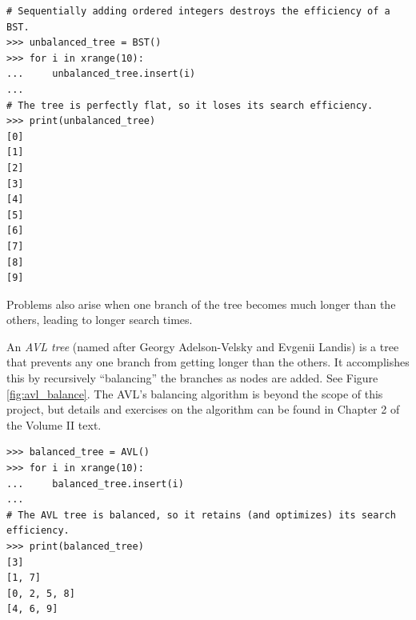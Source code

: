 \begin{lstlisting}
# Sequentially adding ordered integers destroys the efficiency of a BST.
>>> unbalanced_tree = BST()
>>> for i in xrange(10):
...     unbalanced_tree.insert(i)
... 
# The tree is perfectly flat, so it loses its search efficiency.
>>> print(unbalanced_tree)
[0]
[1]
[2]
[3]
[4]
[5]
[6]
[7]
[8]
[9]
\end{lstlisting}

Problems also arise when one branch of the tree becomes much longer than the others, leading to longer search times.

An \emph{AVL tree} (named after Georgy Adelson-Velsky and Evgenii Landis) is a tree that prevents any one branch from getting longer than the others.
It accomplishes this by recursively ``balancing'' the branches as nodes are added.
See Figure \ref{fig:avl_balance}.
The AVL's balancing algorithm is beyond the scope of this project, but details and exercises on the algorithm can be found in Chapter 2 of the Volume II text.

\begin{lstlisting}
>>> balanced_tree = AVL()
>>> for i in xrange(10):
...     balanced_tree.insert(i)
... 
# The AVL tree is balanced, so it retains (and optimizes) its search efficiency.
>>> print(balanced_tree)
[3]
[1, 7]
[0, 2, 5, 8]
[4, 6, 9]
\end{lstlisting}

